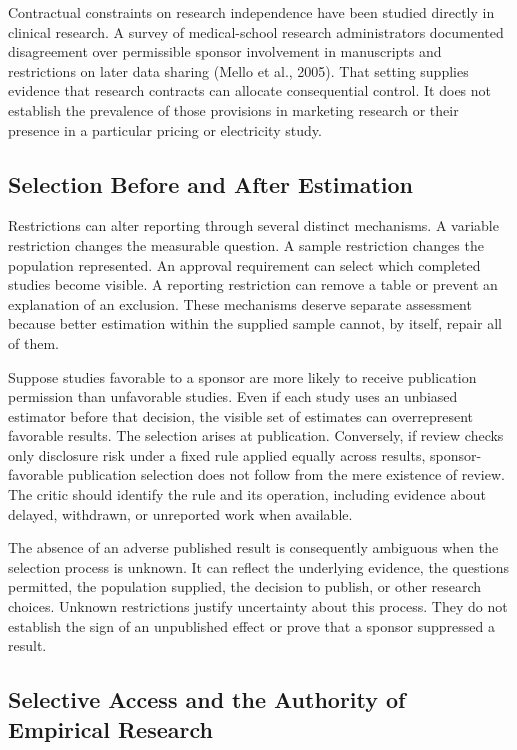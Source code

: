 Contractual constraints on research independence have been studied
directly in clinical research. A survey of medical-school research
administrators documented disagreement over permissible sponsor
involvement in manuscripts and restrictions on later data sharing (Mello
et al., 2005). That setting supplies evidence that research contracts
can allocate consequential control. It does not establish the prevalence
of those provisions in marketing research or their presence in a
particular pricing or electricity study.

\hypertarget{M09-selection-before-and-after-estimation}{%
\subsection{Selection Before and After
Estimation}\label{M09-selection-before-and-after-estimation}}

\noindent Restrictions can alter reporting through several distinct mechanisms. A
variable restriction changes the measurable question. A sample
restriction changes the population represented. An approval requirement
can select which completed studies become visible. A reporting
restriction can remove a table or prevent an explanation of an
exclusion. These mechanisms deserve separate assessment because better
estimation within the supplied sample cannot, by itself, repair all of
them.

Suppose studies favorable to a sponsor are more likely to receive
publication permission than unfavorable studies. Even if each study uses
an unbiased estimator before that decision, the visible set of estimates
can overrepresent favorable results. The selection arises at
publication. Conversely, if review checks only disclosure risk under a
fixed rule applied equally across results, sponsor-favorable publication
selection does not follow from the mere existence of review. The critic
should identify the rule and its operation, including evidence about
delayed, withdrawn, or unreported work when available.

The absence of an adverse published result is consequently ambiguous
when the selection process is unknown. It can reflect the underlying
evidence, the questions permitted, the population supplied, the decision
to publish, or other research choices. Unknown restrictions justify
uncertainty about this process. They do not establish the sign of an
unpublished effect or prove that a sponsor suppressed a result.

\hypertarget{M09-selective-access-and-the-authority-of-empirical-research}{%
\subsection{Selective Access and the Authority of Empirical
Research}\label{M09-selective-access-and-the-authority-of-empirical-research}}


